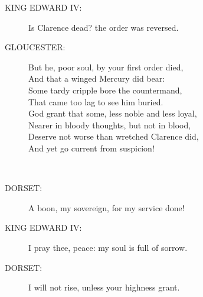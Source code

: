 \documentclass{article}
\begin{document}
\begin{description}
\item[KING EDWARD IV:] 
\hspace{1pt}Is Clarence dead? the order was reversed.\\
\end{description}
\begin{description}
\item[GLOUCESTER:] 
\hspace{1pt}But he, poor soul, by your first order died,\\
\hspace{1pt}And that a winged Mercury did bear:\\
\hspace{1pt}Some tardy cripple bore the countermand,\\
\hspace{1pt}That came too lag to see him buried.\\
\hspace{1pt}God grant that some, less noble and less loyal,\\
\hspace{1pt}Nearer in bloody thoughts, but not in blood,\\
\hspace{1pt}Deserve not worse than wretched Clarence did,\\
\hspace{1pt}And yet go current from suspicion!\\
\end{description}
\\
\begin{description}
\item[DORSET:] 
\hspace{1pt}A boon, my sovereign, for my service done!\\
\end{description}
\begin{description}
\item[KING EDWARD IV:] 
\hspace{1pt}I pray thee, peace: my soul is full of sorrow.\\
\end{description}
\begin{description}
\item[DORSET:] 
\hspace{1pt}I will not rise, unless your highness grant.\\
\end{description}
\end{document}
